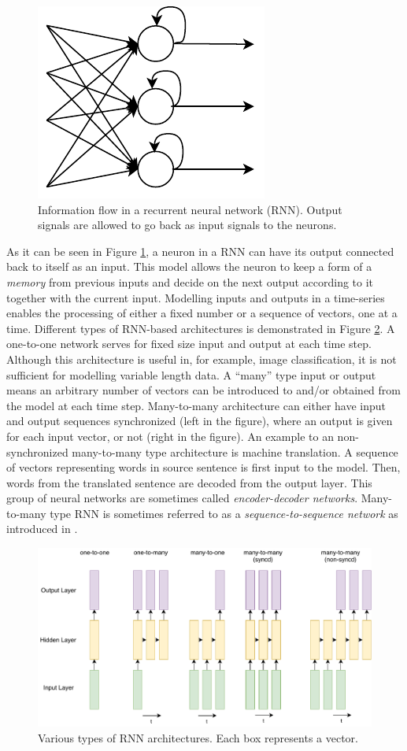 \begin{figure}[t]
  \centering
  \includegraphics[width=0.3\linewidth]{img/RecurrentNeuralNet.pdf}
  \caption{Information flow in a recurrent neural network (RNN). Output signals are allowed to go back as input signals to the neurons. }
  \label{sota:rnn}
\end{figure}

As it can be seen in Figure \ref{sota:rnn}, a neuron in a RNN can have its output connected back to itself as an input. This model allows the neuron to keep a form of a \textit{memory} from previous inputs and decide on the next output according to it together with the current input. Modelling inputs and outputs in a time-series enables the processing of either a fixed number or a sequence of vectors, one at a time. Different types of RNN-based architectures is demonstrated in Figure \ref{sota:rnn_connections}. A one-to-one network serves for fixed size input and output at each time step. Although this architecture is useful in, for example, image classification, it is not sufficient for modelling variable length data. A ``many'' type input or output means an arbitrary number of vectors can be introduced to and/or obtained from the model at each time step. Many-to-many architecture can either have input and output sequences synchronized (left in the figure), where an output is given for each input vector, or not (right in the figure). An example to an non-synchronized many-to-many type architecture is machine translation. A sequence of vectors representing words in source sentence is first input to the model. Then, words from the translated sentence are decoded from the output layer. This group of neural networks are sometimes called \textit{encoder-decoder networks}. Many-to-many type RNN is sometimes referred to as a \textit{sequence-to-sequence network} as introduced in \cite{sutskever}. 

\begin{figure}[t]
  \centering
  \includegraphics[width=\linewidth]{img/rnn_types.pdf}
  \caption{Various types of RNN architectures. Each box represents a vector. }
  \label{sota:rnn_connections}
\end{figure}

